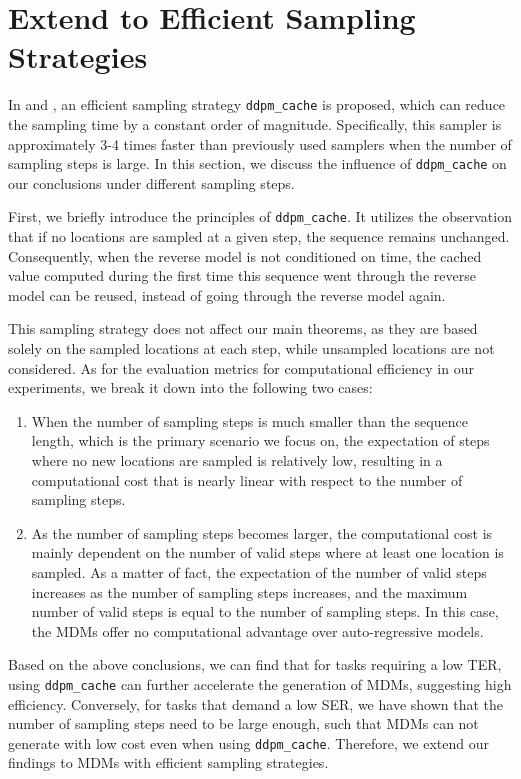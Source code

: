 \vspace{-10pt}
\section{Extend to Efficient Sampling Strategies}
\vspace{-5pt}
\label{app:ddpm_cache}

In \citet{sahoo2024simple} and \citet{ou2024your}, an efficient sampling strategy \verb|ddpm_cache| is proposed, which can reduce the sampling time by a constant order of magnitude. Specifically, this sampler is approximately 3-4 times faster than previously used samplers when the number of sampling steps is large. In this section, we discuss the influence of \verb|ddpm_cache| on our conclusions under different sampling steps.

First, we briefly introduce the principles of \verb|ddpm_cache|. It utilizes the observation that if no locations are sampled at a given step, the sequence remains unchanged. Consequently, when the reverse model is not conditioned on time, the cached value computed during the first time this sequence went through the reverse model can be reused, instead of going through the reverse model again.

This sampling strategy does not affect our main theorems, as they are based solely on the sampled locations at each step, while unsampled locations are not considered. As for the evaluation metrics for computational efficiency in our experiments, we break it down into the following two cases:
\begin{enumerate}[nosep] 
    \item When the number of sampling steps is much smaller than the sequence length, which is the primary scenario we focus on, the expectation of steps where no new locations are sampled is relatively low, resulting in a computational cost that is nearly linear with respect to the number of sampling steps.
    \vspace{5pt}
    \item As the number of sampling steps becomes larger, the computational cost is mainly dependent on the number of valid steps where at least one location is sampled. As a matter of fact, the expectation of the number of valid steps increases as the number of sampling steps increases, and the maximum number of valid steps is equal to the number of sampling steps. In this case, the MDMs offer no computational advantage over auto-regressive models.
\end{enumerate}
Based on the above conclusions, we can find that for tasks requiring a low TER, using \verb|ddpm_cache| can further accelerate the generation of MDMs, suggesting high efficiency. Conversely, for tasks that demand a low SER, we have shown that the number of sampling steps need to be large enough, such that MDMs can not generate with low cost even when using \verb|ddpm_cache|. Therefore, we extend our findings to MDMs with efficient sampling strategies.